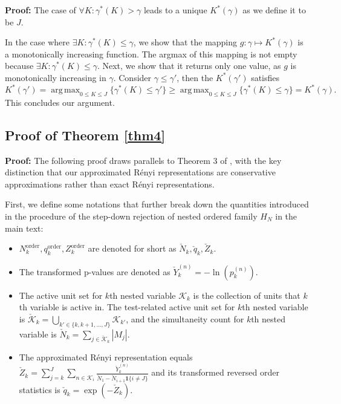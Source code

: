 \documentclass[11pt]{article}
\newcommand{\oo}{\bm{1}}
\DeclareMathOperator*{\argmax}{arg\,max}
\begin{document}
	\textbf{Proof:} The case of $\forall K:\gamma^*(K)>\gamma$ leads to a unique $K^*(\gamma)$ as we define it to be $J$.
	
	In the case where $\exists K:\gamma^*(K)\leq \gamma$, we show that the mapping $g:\gamma\mapsto K^*(\gamma)$ is a monotonically increasing function. The argmax of this mapping is not empty because $\exists K:\gamma^*(K)\leq \gamma$. Next, we show that it returns only one value, as $g$ is monotonically increasing in $\gamma$. Consider $\gamma\leq \gamma'$, then the $K^*(\gamma')$ satisfies
	\begin{equation}
		K^*(\gamma')=	\argmax_{0\leq K\leq J}\{\gamma^*(K)\leq\gamma'\}
		\geq 	\argmax_{0\leq K\leq J}\{\gamma^*(K)\leq\gamma\}=K^*(\gamma).
	\end{equation}
	This concludes our argument.
	
	
	\subsection{Proof of Theorem \ref{thm4}}
	
	\textbf{Proof:} The following proof draws parallels to Theorem 3 of \cite{rssb.12122}, with the key distinction that our approximated R\'enyi representations are conservative approximations rather than exact R\'enyi representations. 
	
	First, we define some notations that further break down the quantities introduced in the procedure of the step-down rejection of nested ordered family $H_{N}$ in the main text:
	\begin{itemize}
		\item ${N}^{\text{order}}_{k},{q}^{\text{order}}_k,{Z}^{\text{order}}_k$ are denoted for short as $\check{N}_k,\check{q}_k,\check{Z}_k$.
		\item The transformed p-values are denoted as $\check{Y}_k^{(n)}=-\ln(p^{(n)}_k)$.
		\item The active unit set for $k$th nested variable $\mathcal{K}_k$ is the collection of units that $k$th variable is active in. The test-related active unit set for $k$th nested variable is $\check{\mathcal{K}}_k=
		\bigcup_{k'\in\{k,k+1,...,J\}} \mathcal{K}_{k'}$, and the simultaneity count for $k$th nested variable is $ \check{N}_k=\sum_{j\in \check{\mathcal{K}}_k}|M_j| $.
		\item The approximated R\'enyi representation equals $\check{Z}_k=\sum_{j=k}^J\sum_{n\in\mathcal{K}_i}
		\frac{ \check{Y}_k^{(n)} }{\check{N}_1-\check{N}_{i+1}\oo\{i\neq J\}}$ and its transformed reversed order statistics is $\check{q}_k=\exp(-\check{Z}_k)$.
	\end{itemize}
	
\end{document}
